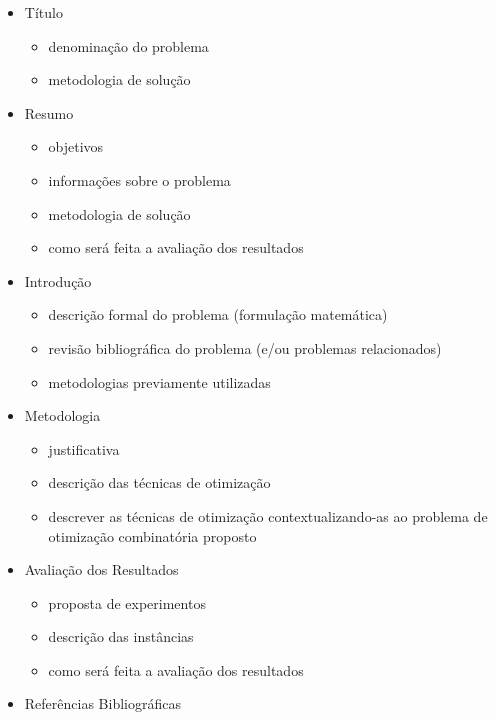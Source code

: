 
\begin{itemize}

    \item Título
    \begin{itemize}
        \item denominação do problema
        \item metodologia de solução
    \end{itemize}

    \item Resumo
    \begin{itemize}
        \item objetivos
        \item informações sobre o problema
        \item metodologia de solução
        \item como será feita a avaliação dos resultados
    \end{itemize}

    \item Introdução
    \begin{itemize}
        \item descrição formal do problema (formulação matemática)
        \item revisão bibliográfica do problema (e/ou problemas relacionados)
        \item metodologias previamente utilizadas
    \end{itemize}

    \item Metodologia
    \begin{itemize}
        \item justificativa
        \item descrição das técnicas de otimização
        \item descrever as técnicas de otimização contextualizando-as ao problema de otimização combinatória proposto
    \end{itemize}

    \item Avaliação dos Resultados
    \begin{itemize}
        \item proposta de experimentos
        \item descrição das instâncias
        \item como será feita a avaliação dos resultados
    \end{itemize}

    \item Referências Bibliográficas

\end{itemize}
